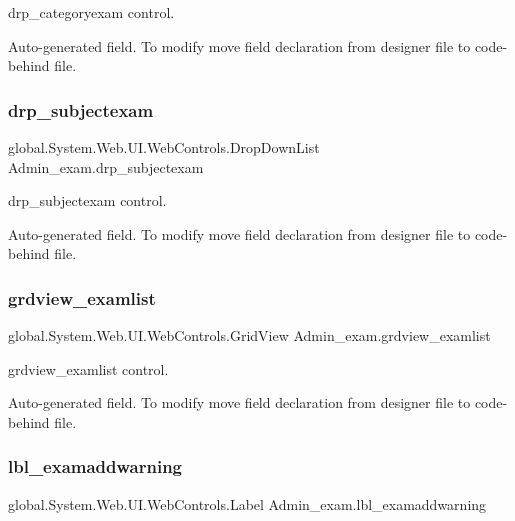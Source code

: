 drp\+\_\+categoryexam control. 

Auto-\/generated field. To modify move field declaration from designer file to code-\/behind file. \mbox{\label{class_admin__exam_a355ee23e9f8e6b131a36d5a7129a6f5c}} 
\subsubsection{\texorpdfstring{drp\_subjectexam}{drp\_subjectexam}}
{\footnotesize\ttfamily global.\+System.\+Web.\+U\+I.\+Web\+Controls.\+Drop\+Down\+List Admin\+\_\+exam.\+drp\+\_\+subjectexam\hspace{0.3cm}{\ttfamily [protected]}}



drp\+\_\+subjectexam control. 

Auto-\/generated field. To modify move field declaration from designer file to code-\/behind file. \mbox{\label{class_admin__exam_ae74df5782c8358a82a959aac2ef67e90}} 
\subsubsection{\texorpdfstring{grdview\_examlist}{grdview\_examlist}}
{\footnotesize\ttfamily global.\+System.\+Web.\+U\+I.\+Web\+Controls.\+Grid\+View Admin\+\_\+exam.\+grdview\+\_\+examlist\hspace{0.3cm}{\ttfamily [protected]}}



grdview\+\_\+examlist control. 

Auto-\/generated field. To modify move field declaration from designer file to code-\/behind file. \mbox{\label{class_admin__exam_ac0c8acdb6a488f886954aeb8acd7cf06}} 
\subsubsection{\texorpdfstring{lbl\_examaddwarning}{lbl\_examaddwarning}}
{\footnotesize\ttfamily global.\+System.\+Web.\+U\+I.\+Web\+Controls.\+Label Admin\+\_\+exam.\+lbl\+\_\+examaddwarning\hspace{0.3cm}{\ttfamily [protected]}}



